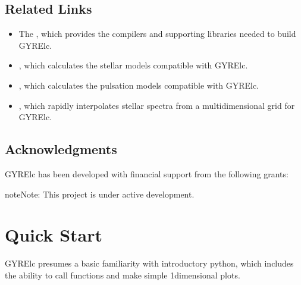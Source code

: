 \documentclass[letterpaper,10pt,english]{sphinxmanual}
\begin{document}
\section{Related Links}
\label{\detokenize{user-guide/preliminaries:related-links}}\begin{itemize}
\item {} 
\sphinxAtStartPar
The , which provides the compilers and supporting libraries needed to build GYRE\sphinxhyphen{}lc.

\item {} 
\sphinxAtStartPar
{}, which calculates the stellar models compatible with GYRE\sphinxhyphen{}lc.

\item {} 
\sphinxAtStartPar
{}, which calculates the pulsation models compatible with GYRE\sphinxhyphen{}lc.

\item {} 
\sphinxAtStartPar
{}, which rapidly interpolates stellar spectra from a multidimensional grid for GYRE\sphinxhyphen{}lc.

\end{itemize}


\section{Acknowledgments}
\label{\detokenize{user-guide/preliminaries:acknowledgments}}
\sphinxAtStartPar
GYRE\sphinxhyphen{}lc has been developed with financial support from the following grants:

\begin{sphinxadmonition}{note}{Note:}
\sphinxAtStartPar
This project is under active development.
\end{sphinxadmonition}


\chapter{Quick Start}
\label{\detokenize{user-guide/quick-start:quick-start}}\label{\detokenize{user-guide/quick-start:id1}}\label{\detokenize{user-guide/quick-start::doc}}
\sphinxAtStartPar
GYRE\sphinxhyphen{}lc presumes a basic familiarity with introductory python, which includes the ability to call functions and make simple 1\sphinxhyphen{}dimensional plots.
\end{document}
